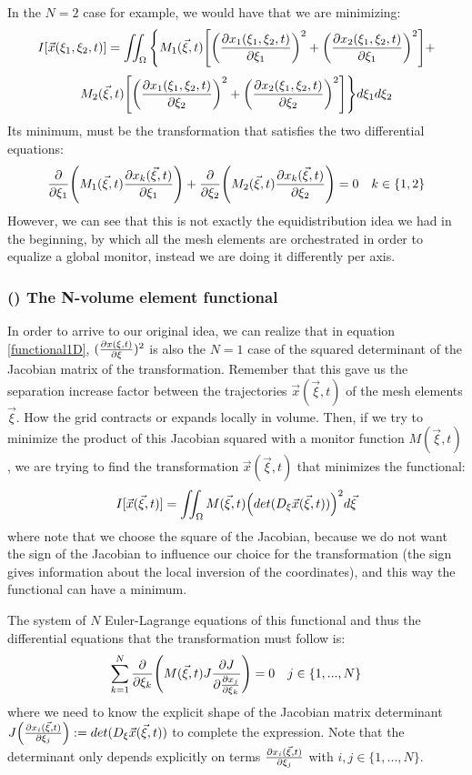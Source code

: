 \documentclass[11pt, a4paper]{article} %
\begin{document}
In the $N=2$ case for example, we would have that we are minimizing:
\begin{equation}
I[\vec{x}(\xi_1, \xi_2,t)]=\iint_\Omega \Bigg\{M_1(\vec{\xi},t) \qty[\qty(\pdv{x_1(\xi_1,\xi_2,t)}{\xi_1})^2+\qty(\pdv{x_2(\xi_1,\xi_2,t)}{\xi_1})^2] +
\end{equation}
$$
M_2(\vec{\xi},t) \qty[\qty(\pdv{x_1(\xi_1,\xi_2,t)}{\xi_2})^2+\qty(\pdv{x_2(\xi_1,\xi_2,t)}{\xi_2})^2]\Bigg\} d\xi_1d\xi_2
$$
Its minimum, must be the transformation that satisfies the two differential equations:
\begin{equation}
\pdv{}{\xi_1} \qty( M_1(\vec{\xi},t)\pdv{x_k(\vec{\xi},t)}{\xi_1} )+\pdv{}{\xi_2}\qty( M_2(\vec{\xi},t)\pdv{x_k(\vec{\xi},t)}{\xi_2} )=0 \quad k\in\{1,2\}
\end{equation}
However, we can see that this is not exactly the equidistribution idea we had in the beginning, by which all the mesh elements are orchestrated in order to equalize a global monitor, instead we are doing it differently per axis.

\subsubsection*{\bf (\textbeta) The N-volume element functional}
In order to arrive to our original idea, we can realize that in equation \eqref{functional1D}, $(\pdv{x(\xi,t)}{\xi})^2$ is also the $N=1$ case of the squared determinant of the Jacobian matrix of the transformation. Remember that this gave us the separation increase factor between the trajectories $\vec{x}(\vec{\xi},t)$ of the mesh elements $\vec{\xi}$. How the grid contracts or expands locally in volume. Then, if we try to minimize the product of this Jacobian squared with a monitor function $M(\vec{\xi},t)$, we are trying to find the transformation $\vec{x}(\vec{\xi},t)$ that minimizes the functional:
\begin{equation}
I[\vec{x}(\vec{\xi},t)]=\iint_\Omega M(\vec{\xi},t) \qty(det(D_\xi \vec{x}(\vec{\xi},t)))^2 d\vec{\xi}
\end{equation}
where note that we choose the square of the Jacobian, because we do not want the sign of the Jacobian to influence our choice for the transformation (the sign gives information about the local inversion of the coordinates), and this way the functional can have a minimum.

The system of $N$ Euler-Lagrange equations of this functional and thus the differential equations that the transformation must follow is:
\begin{equation}
\sum_{k=1}^N \pdv{}{\xi_k} \qty( M(\vec{\xi},t) J \pdv{J }{\pdv{x_j}{\xi_k}} )=0\quad j\in\{1,...,N\}
\end{equation}
where we need to know the explicit shape of the Jacobian matrix determinant $J\qty(\pdv{x_i(\vec{\xi},t)}{\xi_j}):=det(D_\xi \vec{x}(\vec{\xi},t))$ to complete the expression. Note that the determinant only depends explicitly on terms $\pdv{x_i(\vec{\xi},t)}{\xi_j}$ with $i,j\in\{1,...,N\}$.
\end{document}
